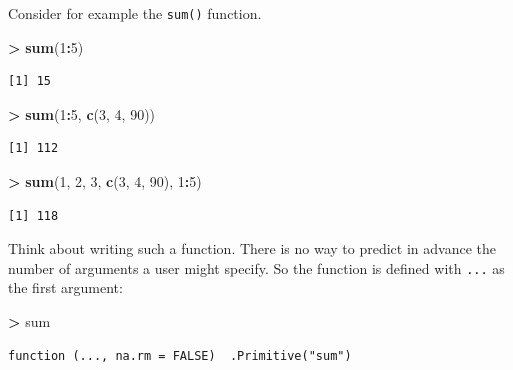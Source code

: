 \documentclass[]{krantz}
\makeatletter
\newenvironment{Shaded}{\begin{snugshade}}{\end{snugshade}}
\newcommand{\DecValTok}[1]{\textcolor[rgb]{0.06,0.06,0.06}{#1}}
\newcommand{\KeywordTok}[1]{\textcolor[rgb]{0.27,0.27,0.27}{\textbf{#1}}}
\newcommand{\NormalTok}[1]{#1}
\newcommand{\OperatorTok}[1]{\textcolor[rgb]{0.43,0.43,0.43}{\textbf{#1}}}
\newcommand{\StringTok}[1]{\textcolor[rgb]{0.5,0.5,0.5}{#1}}
\newenvironment{kframe}{%
\medskip{}
\setlength{\fboxsep}{.8em}
 \def\at@end@of@kframe{}%
 \ifinner\ifhmode%
  \def\at@end@of@kframe{\end{minipage}}%
  \begin{minipage}{\columnwidth}%
 \fi\fi%
 \def\FrameCommand##1{\hskip\@totalleftmargin \hskip-\fboxsep
 \colorbox{shadecolor}{##1}\hskip-\fboxsep
     \hskip-\linewidth \hskip-\@totalleftmargin \hskip\columnwidth}%
 \MakeFramed {\advance\hsize-\width
   \@totalleftmargin\z@ \linewidth\hsize
   \@setminipage}}%
 {\par\unskip\endMakeFramed%
 \at@end@of@kframe}
\renewenvironment{Shaded}{\begin{kframe}}{\end{kframe}}
\makeatother
\begin{document}
Consider for example the \texttt{sum()} function.

\begin{Shaded}
\begin{Highlighting}[]
\OperatorTok{>}\StringTok{ }\KeywordTok{sum}\NormalTok{(}\DecValTok{1}\OperatorTok{:}\DecValTok{5}\NormalTok{)}
\end{Highlighting}
\end{Shaded}

\begin{verbatim}
[1] 15
\end{verbatim}

\begin{Shaded}
\begin{Highlighting}[]
\OperatorTok{>}\StringTok{ }\KeywordTok{sum}\NormalTok{(}\DecValTok{1}\OperatorTok{:}\DecValTok{5}\NormalTok{, }\KeywordTok{c}\NormalTok{(}\DecValTok{3}\NormalTok{, }\DecValTok{4}\NormalTok{, }\DecValTok{90}\NormalTok{))}
\end{Highlighting}
\end{Shaded}

\begin{verbatim}
[1] 112
\end{verbatim}

\begin{Shaded}
\begin{Highlighting}[]
\OperatorTok{>}\StringTok{ }\KeywordTok{sum}\NormalTok{(}\DecValTok{1}\NormalTok{, }\DecValTok{2}\NormalTok{, }\DecValTok{3}\NormalTok{, }\KeywordTok{c}\NormalTok{(}\DecValTok{3}\NormalTok{, }\DecValTok{4}\NormalTok{, }\DecValTok{90}\NormalTok{), }\DecValTok{1}\OperatorTok{:}\DecValTok{5}\NormalTok{)}
\end{Highlighting}
\end{Shaded}

\begin{verbatim}
[1] 118
\end{verbatim}

Think about writing such a function. There is no way to predict in advance the number of arguments a user might specify. So the function is defined with \texttt{...} as the first argument:

\begin{Shaded}
\begin{Highlighting}[]
\OperatorTok{>}\StringTok{ }\NormalTok{sum}
\end{Highlighting}
\end{Shaded}

\begin{verbatim}
function (..., na.rm = FALSE)  .Primitive("sum")
\end{verbatim}
\end{document}
